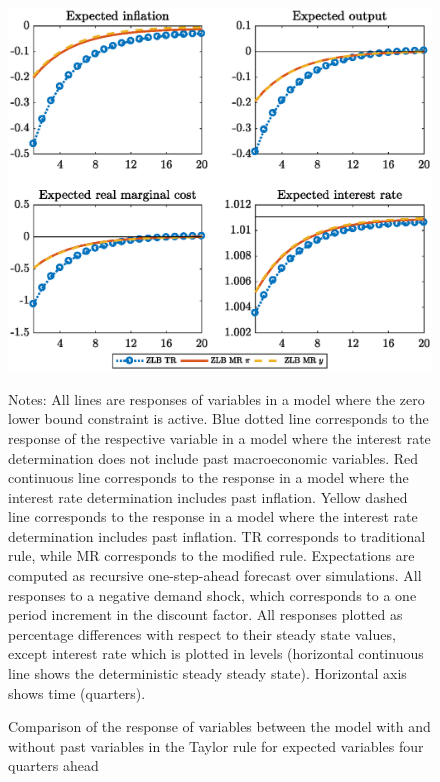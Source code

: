 \documentclass[11pt]{article}
\numberwithin{equation}{section}
\begin{document}
\begin{figure}[H]
	\centering
	\caption{Comparison of the response of variables between the model with and without past variables in the Taylor rule for expected variables four quarters ahead}\label{fig:irfCompExp4_pref}
	\includegraphics[scale=.6]{irfCompExp4_pref}
	\begin{minipage}{\linewidth}
    	\vspace{1mm}
	\footnotesize{{\sc Notes:} All lines are responses of variables in a model where the zero lower bound constraint is active. Blue dotted line corresponds to the response of the respective variable in a model where the interest rate determination does not include past macroeconomic variables. Red continuous line corresponds to the response in a model where the interest rate determination includes past inflation. Yellow dashed line corresponds to the response in a model where the interest rate determination includes past inflation. TR corresponds to traditional rule, while MR corresponds to the modified rule. Expectations are computed as recursive one-step-ahead forecast over simulations. All responses to a negative demand shock, which corresponds to a one period increment in the discount factor. All responses plotted as percentage differences with respect to their steady state values, except interest rate which is plotted in levels (horizontal continuous line shows the deterministic steady steady state). Horizontal axis shows time (quarters).}
	\end{minipage}
\end{figure}
\end{document}
